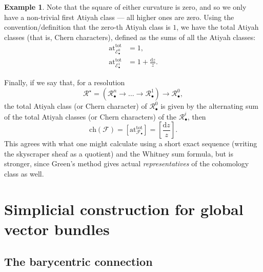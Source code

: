 \documentclass[11pt,fleqn]{article}
\theoremstyle{plain}
\theoremstyle{definition}
\newtheorem{example}[theorem]{Example}
\theoremstyle{remark}
\numberwithin{equation}{theorem}
\newcommand{\anotherbullet}{\star}
\renewcommand{\d}{\mathrm{d}}
\begin{document}
\begin{example}
            Note that the square of either curvature is zero, and so we only have a non-trivial first Atiyah class --- all higher ones are zero.
            Using the convention/definition that the zero-th Atiyah class is $1$, we have the total Atiyah classes (that is, Chern characters), defined as the sums of all the Atiyah classes:
            \begin{align*}
                \mathrm{at}^\mathrm{tot}_{\mathcal{E}_\bullet^0} &= 1,\\
                \mathrm{at}^\mathrm{tot}_{\mathcal{E}_\bullet^1} &= 1+\frac{\d z}{z}.
            \end{align*}

            Finally, if we say that, for a resolution
            \begin{equation*}
                \mathcal{R}^\anotherbullet=(\mathcal{R}_\bullet^n\to\ldots\to\mathcal{R}_\bullet^1)\to\mathcal{R}_\bullet^0,
            \end{equation*}
            the total Atiyah class (or Chern character) of $\mathcal{R}_\bullet^0$ is given by the alternating sum of the total Atiyah classes (or Chern characters) of the $\mathcal{R}_\bullet^i$, then
            \begin{equation*}
                \mathrm{ch}(\mathscr{F})
                =
                \left[\mathrm{at}^\mathrm{tot}_{\mathscr{F}_\bullet}\right]
                =
                \left[\frac{\d z}{z}\right].
            \end{equation*}
            This agrees with what one might calculate using a short exact sequence (writing the skyscraper sheaf as a quotient) and the Whitney sum formula, but is stronger, since Green's method gives actual \emph{representatives} of the cohomology class as well.
        \end{example}



\section{Simplicial construction for global vector bundles}\label{section:simplicial-construction-for-vector-bundles}

    \subsection{The barycentric connection}
\end{document}
